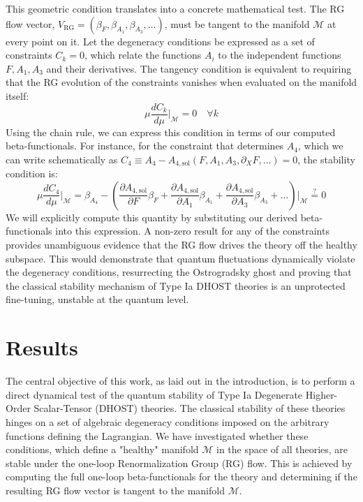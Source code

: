 \documentclass[twocolumn]{aastex631}
\begin{document}
This geometric condition translates into a concrete mathematical test. The RG flow vector, $V_{\text{RG}} = (\beta_F, \beta_{A_1}, \beta_{A_3}, \dots)$, must be tangent to the manifold $\mathcal{M}$ at every point on it. Let the degeneracy conditions be expressed as a set of constraints $C_k = 0$, which relate the functions $A_i$ to the independent functions $F, A_1, A_3$ and their derivatives. The tangency condition is equivalent to requiring that the RG evolution of the constraints vanishes when evaluated on the manifold itself:
\begin{equation}
    \mu \frac{dC_k}{d\mu} \bigg|_{\mathcal{M}} = 0 \quad \forall k
\end{equation}
Using the chain rule, we can express this condition in terms of our computed beta-functionals. For instance, for the constraint that determines $A_4$, which we can write schematically as $C_4 \equiv A_4 - A_{4,\text{sol}}(F, A_1, A_3, \partial_X F, \dots) = 0$, the stability condition is:
\begin{equation}
    \mu \frac{dC_4}{d\mu} \bigg|_{\mathcal{M}} = \beta_{A_4} - \left( \frac{\partial A_{4,\text{sol}}}{\partial F}\beta_F + \frac{\partial A_{4,\text{sol}}}{\partial A_1}\beta_{A_1} + \frac{\partial A_{4,\text{sol}}}{\partial A_3}\beta_{A_3} + \dots \right) \bigg|_{\mathcal{M}} \stackrel{?}{=} 0
\end{equation}
We will explicitly compute this quantity by substituting our derived beta-functionals into this expression. A non-zero result for any of the constraints provides unambiguous evidence that the RG flow drives the theory off the healthy subspace. This would demonstrate that quantum fluctuations dynamically violate the degeneracy conditions, resurrecting the Ostrogradsky ghost and proving that the classical stability mechanism of Type Ia DHOST theories is an unprotected fine-tuning, unstable at the quantum level.

\section{Results}
\label{sec:results}
The central objective of this work, as laid out in the introduction, is to perform a direct dynamical test of the quantum stability of Type Ia Degenerate Higher-Order Scalar-Tensor (DHOST) theories. The classical stability of these theories hinges on a set of algebraic degeneracy conditions imposed on the arbitrary functions defining the Lagrangian. We have investigated whether these conditions, which define a "healthy" manifold $\mathcal{M}$ in the space of all theories, are stable under the one-loop Renormalization Group (RG) flow. This is achieved by computing the full one-loop beta-functionals for the theory and determining if the resulting RG flow vector is tangent to the manifold $\mathcal{M}$.
\end{document}
